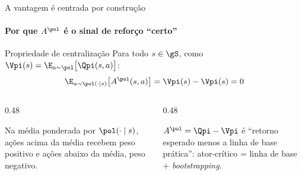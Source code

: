 \documentclass[aspectratio=169, 11pt]{beamer}
\begin{document}
\begin{frame}{A vantagem é centrada por construção}
  \framesubtitle{Por que $A^{\pol}$ é o sinal de reforço ``certo''}

  \begin{teobox}{Propriedade de centralização}
    Para todo $s\in\gS$, como $\Vpi(s) = \E_{a\sim\pol}\big[\Qpi(s,a)\big]$:
    \[
      \E_{a\sim\pol(\cdot\mid s)}\big[A^{\pol}(s,a)\big] = \Vpi(s) - \Vpi(s) = 0
    \]
  \end{teobox}

  \begin{columns}[T]
    \begin{column}{0.48\textwidth}
      \begin{ideiabox}[title={Sinal de média zero}]
        Na média ponderada por $\pol(\cdot\mid s)$, ações acima da média recebem peso
        positivo e ações abaixo da média, peso negativo.
      \end{ideiabox}
    \end{column}
    \begin{column}{0.48\textwidth}
      \begin{ideiabox}[title={Ligação com a linha de base}]
        $A^{\pol} = \Qpi - \Vpi$ é ``retorno esperado menos a linha de base prática'':
        ator-crítico = linha de base + \emph{bootstrapping}.
      \end{ideiabox}
    \end{column}
  \end{columns}
\end{frame}
\end{document}
